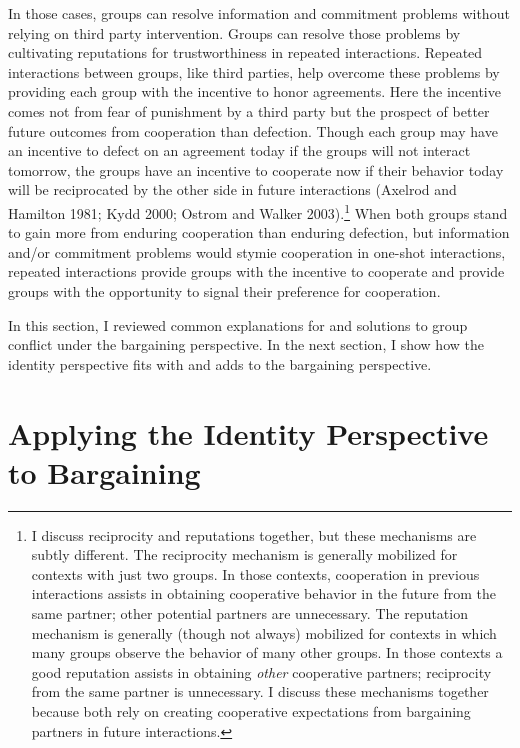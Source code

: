 \documentclass[11pt]{article}
\begin{document}
In those cases, groups can resolve information and commitment problems
without relying on third party intervention. Groups can resolve those
problems by cultivating reputations for trustworthiness in repeated
interactions. Repeated interactions between groups, like third parties,
help overcome these problems by providing each group with the incentive
to honor agreements. Here the incentive comes not from fear of
punishment by a third party but the prospect of better future outcomes
from cooperation than defection. Though each group may have an incentive
to defect on an agreement today if the groups will not interact
tomorrow, the groups have an incentive to cooperate now if their
behavior today will be reciprocated by the other side in future
interactions (Axelrod and Hamilton 1981; Kydd 2000; Ostrom and Walker
2003).\footnote{I discuss reciprocity and reputations together, but
  these mechanisms are subtly different. The reciprocity mechanism is
  generally mobilized for contexts with just two groups. In those
  contexts, cooperation in previous interactions assists in obtaining
  cooperative behavior in the future from the same partner; other
  potential partners are unnecessary. The reputation mechanism is
  generally (though not always) mobilized for contexts in which many
  groups observe the behavior of many other groups. In those contexts a
  good reputation assists in obtaining \emph{other} cooperative
  partners; reciprocity from the same partner is unnecessary. I discuss
  these mechanisms together because both rely on creating cooperative
  expectations from bargaining partners in future interactions.} When
both groups stand to gain more from enduring cooperation than enduring
defection, but information and/or commitment problems would stymie
cooperation in one-shot interactions, repeated interactions provide
groups with the incentive to cooperate and provide groups with the
opportunity to signal their preference for cooperation.

In this section, I reviewed common explanations for and solutions to
group conflict under the bargaining perspective. In the next section, I
show how the identity perspective fits with and adds to the bargaining
perspective.

\hypertarget{applying-the-identity-perspective-to-bargaining}{%
\section{Applying the Identity Perspective to
Bargaining}\label{applying-the-identity-perspective-to-bargaining}}
\end{document}
